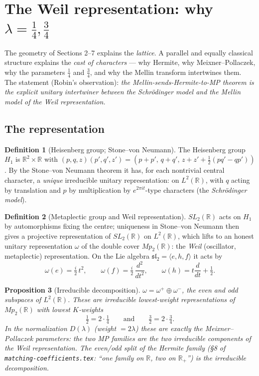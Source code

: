 \documentclass[11pt]{article}
\newtheorem{proposition}{Proposition}[section]
\theoremstyle{definition}
\newtheorem{definition}[proposition]{Definition}
\theoremstyle{remark}
\newcommand{\R}{\mathbb{R}}
\begin{document}
\section{The Weil representation: why $\lambda = \tfrac14, \tfrac34$}
\label{sec:weil}

The geometry of Sections 2--7 explains the \emph{lattice}. A
parallel and equally classical structure explains the \emph{cast of
characters} --- why Hermite, why Meixner--Pollaczek, why the
parameters $\tfrac14$ and $\tfrac34$, and why the Mellin transform
intertwines them. The statement (Robin's observation): \emph{the
Mellin-sends-Hermite-to-MP theorem is the explicit unitary
intertwiner between the Schr\"odinger model and the Mellin model of
the Weil representation.}

\subsection{The representation}

\begin{definition}[Heisenberg group; Stone--von Neumann]
The Heisenberg group $H_1$ is $\R^2 \times \R$ with
$(p,q,z)(p',q',z') = (p{+}p',\, q{+}q',\, z{+}z'+\tfrac12(pq'-qp'))$.
By the Stone--von Neumann theorem it has, for each nontrivial
central character, a \emph{unique} irreducible unitary
representation: on $L^2(\R)$, with $q$ acting by translation and
$p$ by multiplication by $e^{2\pi i t}$-type characters (the
\emph{Schr\"odinger model}).
\end{definition}

\begin{definition}[Metaplectic group and Weil representation]
$SL_2(\R)$ acts on $H_1$ by automorphisms fixing the centre;
uniqueness in Stone--von Neumann then gives a projective
representation of $SL_2(\R)$ on $L^2(\R)$, which lifts to an
honest unitary representation $\omega$ of the double cover
$Mp_2(\R)$: the \emph{Weil} (oscillator, metaplectic)
representation. On the Lie algebra $\mathfrak{sl}_2 =
\langle e, h, f \rangle$ it acts by
\[
  \omega(e) = \tfrac{i}{2}\,t^2, \qquad
  \omega(f) = \tfrac{i}{2}\,\frac{d^2}{dt^2}, \qquad
  \omega(h) = t\frac{d}{dt} + \tfrac12 .
\]
\end{definition}

\begin{proposition}[Irreducible decomposition]\label{prop:weilsplit}
$\omega = \omega^+ \oplus \omega^-$, the even and odd subspaces of
$L^2(\R)$. These are irreducible lowest-weight representations of
$Mp_2(\R)$ with lowest $K$-weights
\[
  \tfrac12 = 2\cdot\tfrac14
  \qquad\text{and}\qquad
  \tfrac32 = 2\cdot\tfrac34 .
\]
In the normalization $D(\lambda)$ (weight $= 2\lambda$) these are
exactly the Meixner--Pollaczek parameters: \emph{the two MP
families are the two irreducible components of the Weil
representation.} The even/odd split of the Hermite family
(\S8 of \texttt{matching-coefficients.tex}: ``one family on $\R$,
two on $\R_+$'') is the irreducible decomposition.
\end{proposition}
\end{document}
